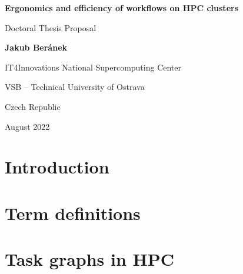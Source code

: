 \documentclass[11pt]{article}
\begin{document}
\begin{titlepage}
    \begin{center}
        \vspace*{1cm}
        \par
        \Huge
        \textbf{Ergonomics and efficiency of workflows on HPC clusters}
        \par
        \vspace{0.5cm}
        \LARGE
        Doctoral Thesis Proposal
        \par
        \vspace{1.5cm}
        \par
        \textbf{Jakub Beránek}
        \par
        \vspace{6cm}
        \par
        {
            \Large
            IT4Innovations National Supercomputing Center\par
            VSB -- Technical University of Ostrava\par
            Czech Republic\par
            August 2022
        }
    \end{center}

    \vspace{1.5cm}
\end{titlepage}

\tableofcontents
\clearpage

\section{Introduction}
\label{sec:introduction}


\section{Term definitions}
\label{sec:task_graph_definition}


\section{Task graphs in HPC}
\label{sec:challenges}


%
\end{document}
